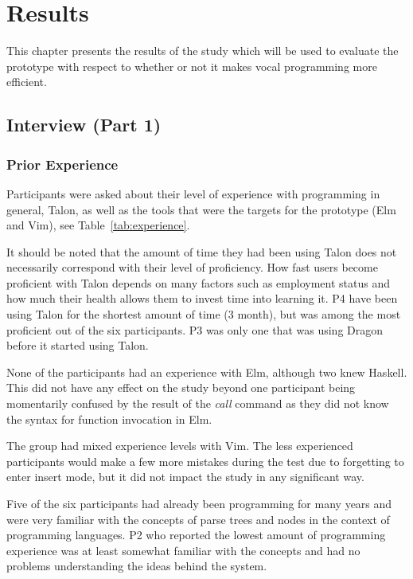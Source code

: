 \documentclass[../thesis.tex]{subfiles}
\begin{document}
\chapter{Results}\label{results}
This chapter presents the results of the study
which will be used to evaluate
the prototype with respect to whether or not it makes
vocal programming more efficient.


\section{Interview (Part 1)}%
\label{sec:interview_1}

\subsection{Prior Experience}%
\label{sub:prior_experience}
Participants were asked about their level of experience with programming in general, Talon, 
as well as the tools that were the targets for the prototype (Elm and Vim),
see Table~\ref{tab:experience}.

It should be noted that the amount of time they had been using Talon
does not necessarily correspond with their level of proficiency.
How fast users become proficient with Talon depends on many factors
such as employment status and how much their health allows them to invest time into learning it.
P4 have been using Talon for the shortest amount of time (3 month), but was among the most proficient
out of the six participants.
P3 was only one that was using Dragon before it started using Talon.

None of the participants had an experience with Elm, although two knew Haskell.
This did not have any effect on the study beyond one participant
being momentarily confused by the result of the \textit{call} command
as they did not know the syntax for function invocation in Elm.

The group had mixed experience levels with Vim.
The less experienced participants would make a few
more mistakes during the test due to forgetting to enter insert mode, 
but it did not impact the study in any significant way.

Five of the six participants had already been programming for many years
and were very familiar with the concepts of parse trees and nodes
in the context of programming languages.
P2 who reported the lowest amount of programming experience
was at least somewhat familiar with the concepts and had no problems
understanding the ideas behind the system.
\end{document}
